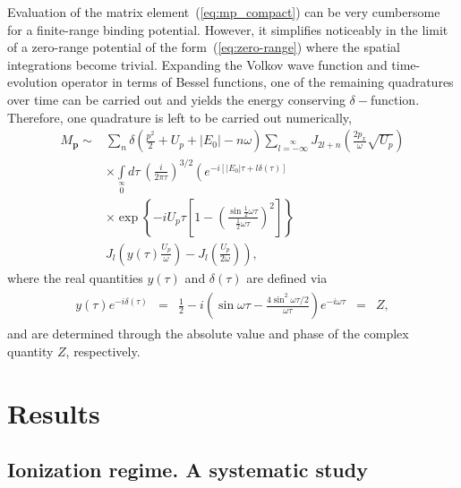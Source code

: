 Evaluation of the matrix element~(\ref{eq:mp_compact}) can be very
cumbersome for a finite-range binding potential. However, it
simplifies noticeably in the limit of a zero-range potential of the
form~(\ref{eq:zero-range}) where the spatial integrations become
trivial. Expanding the Volkov wave function and time-evolution
operator in terms of Bessel functions, one of the remaining
quadratures over time can be carried out and yields the energy
conserving $\delta-$function. Therefore, one quadrature is left to be
carried out numerically,
%
\begin{equation}
\label{eq:Mp_quad}
\begin{split}
M_{\mathbf{p}} \sim &
\sum\limits_{n} \delta\left(\frac{p^{2}}{2} + U_{p} + |E_{0}| - n\omega\right)
\sum\limits_{l=-\infty}\limits^{\infty}
J_{2l+n}\left( \frac{2p_{x}}{\omega} \sqrt{U_{p}} \right) \\
& \times \int\limits_{0}\limits^{\infty} d\tau\ \left( \frac{i}{2\pi\tau} \right)^{3/2}
\left( e^{-i[|E_{0}|\tau + l\delta(\tau)]} \right. \\
& \times \exp\left\{-iU_{p}\tau
\left[1 - \left(\frac{\sin\frac{1}{2}\omega\tau}{\frac{1}{2}\omega\tau}\right)^{2}\right]
\right\} \\
& \left. J_{l}\left(y(\tau)\frac{U_{p}}{\omega}\right)
- J_{l}\left(\frac{U_{p}}{2\omega}\right)
\right),
\end{split}
\end{equation}
%
where the real quantities $y(\tau)$ and $\delta(\tau)$ are defined via
%
\begin{eqnarray}
\label{eq:real_quant}
\begin{split}
y(\tau) e^{-i \delta(\tau)} & = & \frac{1}{2} - i \left(
\sin\omega\tau - \frac{4 \sin^{2}\omega\tau/2}{\omega\tau} \right)
e^{-i\omega\tau} & = & Z,
\end{split}
\end{eqnarray}
%
and are determined through the absolute value and phase of the complex
quantity $Z$, respectively.




\section{\label{sec:results_qm} Results}
\subsection{\label{sec:kopold_qm} Ionization regime. A systematic study}

